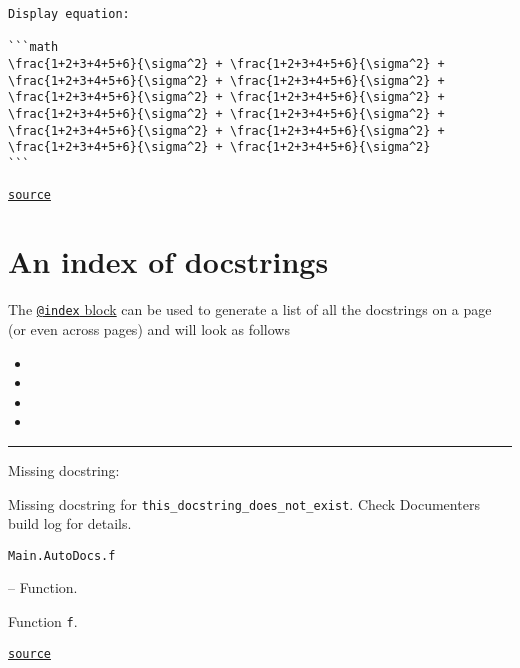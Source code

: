 \begin{adjustwidth}{2em}{0pt}
\begin{lstlisting}
Display equation:

```math
\frac{1+2+3+4+5+6}{\sigma^2} + \frac{1+2+3+4+5+6}{\sigma^2} + \frac{1+2+3+4+5+6}{\sigma^2} + \frac{1+2+3+4+5+6}{\sigma^2} + \frac{1+2+3+4+5+6}{\sigma^2} + \frac{1+2+3+4+5+6}{\sigma^2} + \frac{1+2+3+4+5+6}{\sigma^2} + \frac{1+2+3+4+5+6}{\sigma^2} + \frac{1+2+3+4+5+6}{\sigma^2} + \frac{1+2+3+4+5+6}{\sigma^2} + \frac{1+2+3+4+5+6}{\sigma^2} + \frac{1+2+3+4+5+6}{\sigma^2}
```
\end{lstlisting}



\href{https://example.org/Repository.jl/blob/test/examples/make.jl#L41-71}{\texttt{source}}


\end{adjustwidth}

\section{An index of docstrings}



\label{4901604269105032859}{}


The \href{@ref}{\texttt{@index} block} can be used to generate a list of all the docstrings on a page (or even across pages) and will look as follows


\begin{itemize}
\item {}
\item {}
\item {}
\item {}
\end{itemize}


{\rule{\textwidth}{1pt}}


Missing docstring:



\begin{tcolorbox}[colback=admonition-warning!5!white,colframe=admonition-warning!75!black,title={Missing docstring.}]
Missing docstring for \texttt{this\_docstring\_does\_not\_exist}. Check Documenter{\textquotesingle}s build log for details.

\end{tcolorbox}

\hypertarget{5308965026370084775}{\texttt{Main.AutoDocs.f}}  -- {Function.}

\begin{adjustwidth}{2em}{0pt}

Function \texttt{f}.



\href{https://example.org/Repository.jl/blob/test/examples/make.jl#L85-85}{\texttt{source}}


\end{adjustwidth}


